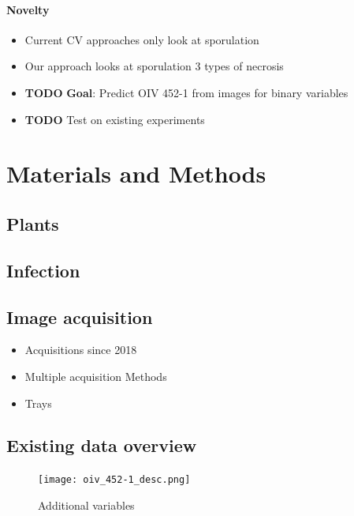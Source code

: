 \documentclass[english]{article}
\begin{document}
\paragraph*{Novelty}

\begin{itemize}
	\item Current CV approaches only look at sporulation
	\item Our approach looks at sporulation 3 types of necrosis
	\item \textbf{TODO} \textbf{Goal}: Predict OIV 452-1 from images for binary variables
	\item \textbf{TODO} Test on existing experiments
\end{itemize}

\section*{Materials and Methods}

\subsection*{Plants}

\parencite{bellinResistancePlasmoparaViticola2009}

\subsection*{Infection}

\parencite{bellinResistancePlasmoparaViticola2009}

\subsection*{Image acquisition}

\begin{itemize}
	\item Acquisitions since 2018
	\item Multiple acquisition Methods
	\item Trays
\end{itemize}

\subsection*{Existing data overview}

\begin{figure}
	\begin{center}
		\texttt{[image: oiv\_452-1\_desc.png]}
		\caption{Additional variables}\label{fig:newvariables}
	\end{center}
\end{figure}
\end{document}
